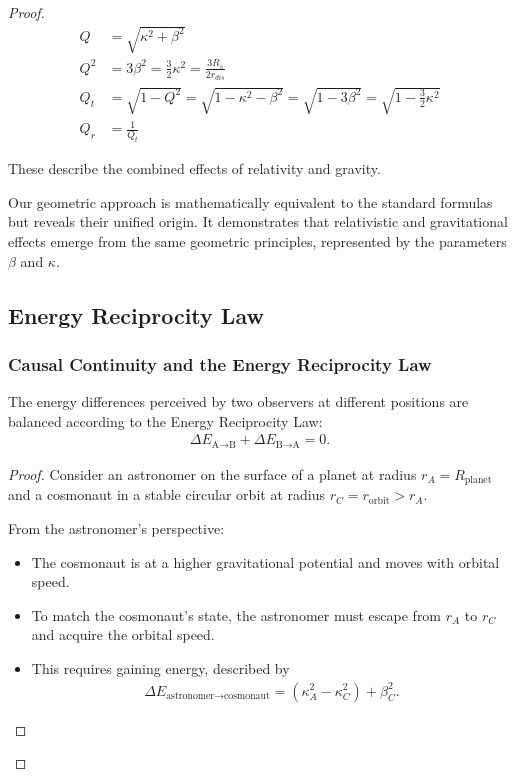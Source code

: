 \documentclass{article}
\begin{document}
\begin{theorem}
\begin{proof}
\begin{align}
    Q &=\sqrt{\kappa^2 + \beta^2}  \\
    Q^{2}&= 3\beta^2 = \frac{3}{2}\kappa^2 = \frac{3R_s}{2r_{dis}} \\
    Q_t &= \sqrt{1-Q^2} = \sqrt{1-\kappa^2-\beta^2} = \sqrt{1-3\beta^2} = \sqrt{1-\frac{3}{2}\kappa^2} \\
    Q_r &= \frac{1}{Q_t}
\end{align}

These describe the combined effects of relativity and gravity.

\begin{tcolorbox}[colback=gray!5, colframe=black!80!black, title=Unified Interpretation]
Our geometric approach is mathematically equivalent to the standard formulas but reveals their unified origin. It demonstrates that relativistic and gravitational effects emerge from the same geometric principles, represented by the parameters $\beta$ and $\kappa$.
\end{tcolorbox}


\subsection{Energy Reciprocity Law}

\subsubsection{Causal Continuity and the Energy Reciprocity Law}

\begin{theorem}
The energy differences perceived by two observers at different positions are balanced according to the Energy Reciprocity Law:
\begin{align}
\Delta E_{\text{A}\rightarrow\text{B}} + \Delta E_{\text{B}\rightarrow\text{A}} = 0.
\end{align}
\end{theorem}

\begin{proof}
Consider an astronomer on the surface of a planet at radius $r_A = R_{\text{planet}}$ and a cosmonaut in a stable circular orbit at radius $r_C = r_{\text{orbit}} > r_A$.

From the astronomer's perspective:
\begin{itemize}
\item The cosmonaut is at a higher gravitational potential and moves with orbital speed.
\item To match the cosmonaut's state, the astronomer must escape from $r_A$ to $r_C$ and acquire the orbital speed.
\item This requires gaining energy, described by
\begin{align}
\Delta E_{\text{astronomer}\rightarrow\text{cosmonaut}} = (\kappa^2_A - \kappa^2_C) + \beta^2_C.
\end{align}
\end{itemize}


\end{proof}
\end{proof}
\end{theorem}
\end{document}
